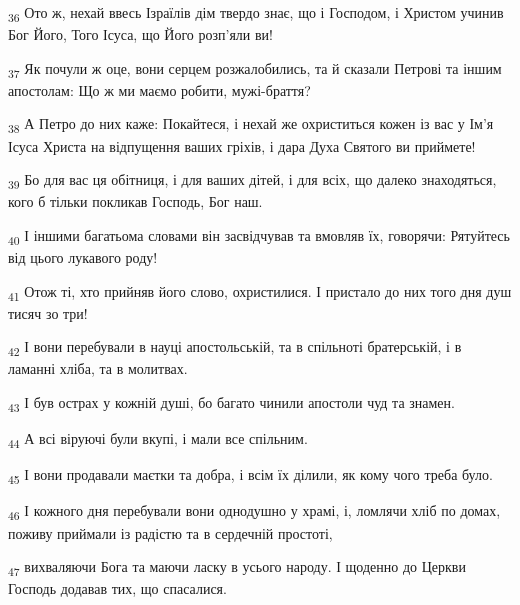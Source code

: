 \begin{tcolorbox}
\textsubscript{36} Ото ж, нехай ввесь Ізраїлів дім твердо знає, що і Господом, і Христом учинив Бог Його, Того Ісуса, що Його розп'яли ви!
\end{tcolorbox}
\begin{tcolorbox}
\textsubscript{37} Як почули ж оце, вони серцем розжалобились, та й сказали Петрові та іншим апостолам: Що ж ми маємо робити, мужі-браття?
\end{tcolorbox}
\begin{tcolorbox}
\textsubscript{38} А Петро до них каже: Покайтеся, і нехай же охриститься кожен із вас у Ім'я Ісуса Христа на відпущення ваших гріхів, і дара Духа Святого ви приймете!
\end{tcolorbox}
\begin{tcolorbox}
\textsubscript{39} Бо для вас ця обітниця, і для ваших дітей, і для всіх, що далеко знаходяться, кого б тільки покликав Господь, Бог наш.
\end{tcolorbox}
\begin{tcolorbox}
\textsubscript{40} І іншими багатьома словами він засвідчував та вмовляв їх, говорячи: Рятуйтесь від цього лукавого роду!
\end{tcolorbox}
\begin{tcolorbox}
\textsubscript{41} Отож ті, хто прийняв його слово, охристилися. І пристало до них того дня душ тисяч зо три!
\end{tcolorbox}
\begin{tcolorbox}
\textsubscript{42} І вони перебували в науці апостольській, та в спільноті братерській, і в ламанні хліба, та в молитвах.
\end{tcolorbox}
\begin{tcolorbox}
\textsubscript{43} І був острах у кожній душі, бо багато чинили апостоли чуд та знамен.
\end{tcolorbox}
\begin{tcolorbox}
\textsubscript{44} А всі віруючі були вкупі, і мали все спільним.
\end{tcolorbox}
\begin{tcolorbox}
\textsubscript{45} І вони продавали маєтки та добра, і всім їх ділили, як кому чого треба було.
\end{tcolorbox}
\begin{tcolorbox}
\textsubscript{46} І кожного дня перебували вони однодушно у храмі, і, ломлячи хліб по домах, поживу приймали із радістю та в сердечній простоті,
\end{tcolorbox}
\begin{tcolorbox}
\textsubscript{47} вихваляючи Бога та маючи ласку в усього народу. І щоденно до Церкви Господь додавав тих, що спасалися.
\end{tcolorbox}
